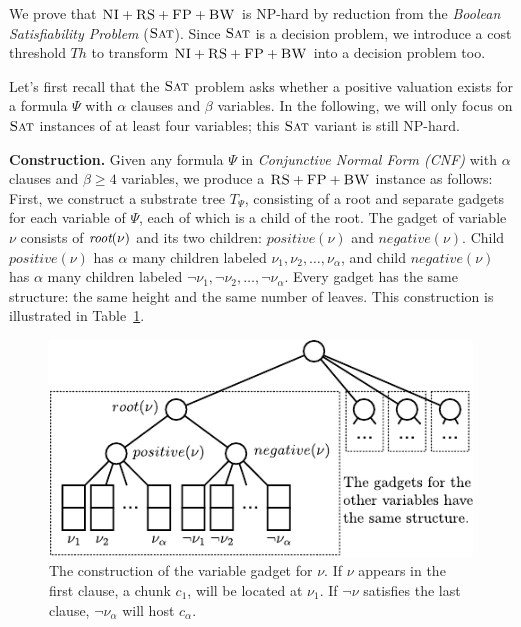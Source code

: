 \documentclass[conference,10pt]{IEEEtran}
\newcommand{\variab}{\nu}
\newcommand{\aroot}{\emph{root}}
\newcommand{\clauses}{\alpha}
\newcommand{\variables}{\beta}
\newcommand{\achunk}{\ensuremath{c}}
\newcommand{\CC}{\textsc{NI}}
\newcommand{\FP}{\textsc{FP}}
\newcommand{\RS}{\textsc{RS}}
\newcommand{\BW}{\textsc{BW}}
\newcommand{\Tree}{\ensuremath{T}}
\newcommand{\SAT}{\textsc{Sat}}
\newcommand{\Formula}{\ensuremath{\Psi}}
\newcommand{\Thr}{\ensuremath{Th}}
\newcommand{\positive}{\ensuremath{positive}}
\newcommand{\negative}{\ensuremath{negative}}
\begin{document}
We prove that $\CC+\RS+\FP+\BW$ is NP-hard by reduction from the \emph{Boolean Satisfiability Problem} ($\SAT$).
Since $\SAT$ is a decision
problem, we
introduce a cost threshold $\Thr$ to transform $\CC+\RS+\FP+\BW$ into a decision problem too.

Let's first recall that the $\SAT$ problem asks whether a positive valuation exists
for a formula $\Formula$ with $\clauses$ clauses and $\variables$
variables.
In the following, we will only focus on $\SAT$ instances of at least four variables;
this $\SAT$ variant is still NP-hard.

\textbf{Construction.}
Given any formula $\Formula$ in \emph{Conjunctive Normal Form (CNF)} with
$\clauses$ clauses and $\variables \geq 4$ variables, we produce
a $\RS+\FP+\BW$ instance as follows: First, we construct a substrate tree
$\Tree_{\Formula}$, consisting of
a root and separate gadgets for each variable of $\Formula$, each of which
is a child of the root.
The gadget of variable $\variab$ consists of $\aroot(\variab)$ and its two children:
$\positive(\variab)$ and $\negative(\variab)$. Child $\positive(\variab)$ has $\clauses$
many children labeled $\nu_1, \nu_2, \ldots,
\nu_{\clauses}$, and child
$\negative(\variab)$ has
$\clauses$ many children labeled $\neg \nu_1, \neg \nu_2, \dots,
\neg \nu_{\clauses}$. Every
gadget has the same structure: the same height and the same number of
leaves. This construction is illustrated in
Table~\ref{fig:construction_3sat}.


\begin{figure}
\includegraphics[width=\columnwidth]{figs/construction_3sat}
\caption{The construction of the variable gadget for $\nu$. If 
$\nu$ appears in the
first clause, a chunk $\achunk_1$, will be located at $\nu_1$. If $\neg \nu$
satisfies the last clause, $\neg
\nu_\alpha$ will host $\achunk_\alpha$.}
\label{fig:construction_3sat}
\end{figure}
\end{document}
